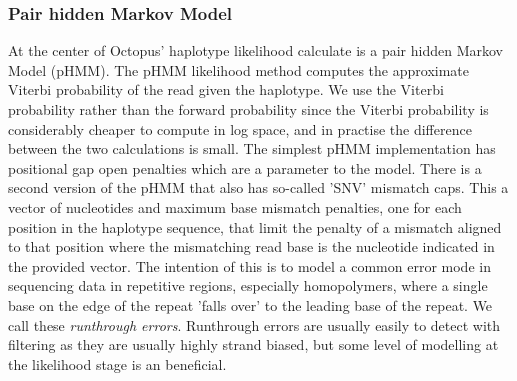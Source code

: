 \documentclass{article}
\begin{document}
\subsubsection{Pair hidden Markov Model}

At the center of Octopus' haplotype likelihood calculate is a pair hidden Markov Model (pHMM). The pHMM likelihood method computes the approximate Viterbi probability of the read given the haplotype. We use the Viterbi probability rather than the forward probability since the Viterbi probability is considerably cheaper to compute in log space, and in practise the difference between the two calculations is small. The simplest pHMM implementation has positional gap open penalties which are a parameter to the model. There is a second version of the pHMM that also has so-called 'SNV' mismatch caps. This a vector of nucleotides and maximum base mismatch penalties, one for each position in the haplotype sequence, that limit the penalty of a mismatch aligned to that position where the mismatching read base is the nucleotide indicated in the provided vector. The intention of this is to model a common error mode in sequencing data in repetitive regions, especially homopolymers, where a single base on the edge of the repeat 'falls over' to the leading base of the repeat. We call these \emph{runthrough errors}. Runthrough errors are usually easily to detect with filtering as they are usually highly strand biased, but some level of modelling at the likelihood stage is an beneficial.
\end{document}
